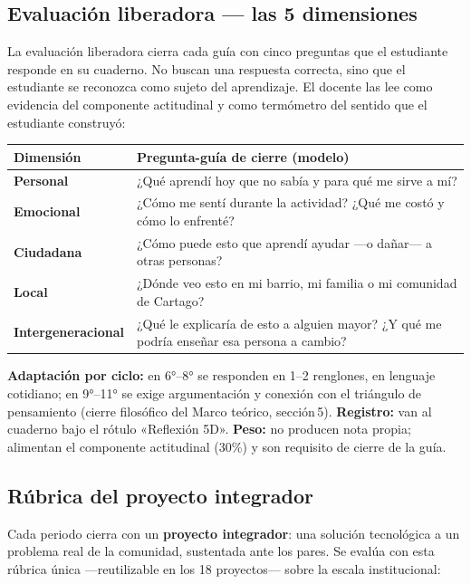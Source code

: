 \documentclass[12pt, a4paper]{article}
\begin{document}
\subsection{Evaluación liberadora — las 5 dimensiones}

La evaluación liberadora cierra cada guía con cinco preguntas que el estudiante
responde en su cuaderno. No buscan una respuesta correcta, sino que el estudiante
se reconozca como sujeto del aprendizaje. El docente las lee como evidencia del
componente actitudinal y como termómetro del sentido que el estudiante construyó:

\begin{center}
\begin{tabular}{|L{3.2cm}|L{10.8cm}|}
\hline
{}
\color{white}\textbf{Dimensión} & \color{white}\textbf{Pregunta-guía de cierre (modelo)} \\
\hline
\textbf{Personal} & ¿Qué aprendí hoy que no sabía y para qué me sirve a mí? \\
\hline
\textbf{Emocional} & ¿Cómo me sentí durante la actividad? ¿Qué me costó y cómo lo enfrenté? \\
\hline
\textbf{Ciudadana} & ¿Cómo puede esto que aprendí ayudar —o dañar— a otras personas? \\
\hline
\textbf{Local} & ¿Dónde veo esto en mi barrio, mi familia o mi comunidad de Cartago? \\
\hline
\textbf{Intergeneracional} & ¿Qué le explicaría de esto a alguien mayor? ¿Y qué me podría enseñar esa persona a cambio? \\
\hline
\end{tabular}
\end{center}

\noindent\textbf{Adaptación por ciclo:} en 6°–8° se responden en 1–2 renglones,
en lenguaje cotidiano; en 9°–11° se exige argumentación y conexión con el
triángulo de pensamiento (cierre filosófico del Marco teórico, sección\,5).
\textbf{Registro:} van al cuaderno bajo el rótulo «Reflexión 5D».
\textbf{Peso:} no producen nota propia; alimentan el componente actitudinal
(30\%) y son requisito de cierre de la guía.

\subsection{Rúbrica del proyecto integrador}

Cada periodo cierra con un \textbf{proyecto integrador}: una solución tecnológica
a un problema real de la comunidad, sustentada ante los pares. Se evalúa con esta
rúbrica única —reutilizable en los 18 proyectos— sobre la escala institucional:
\end{document}
